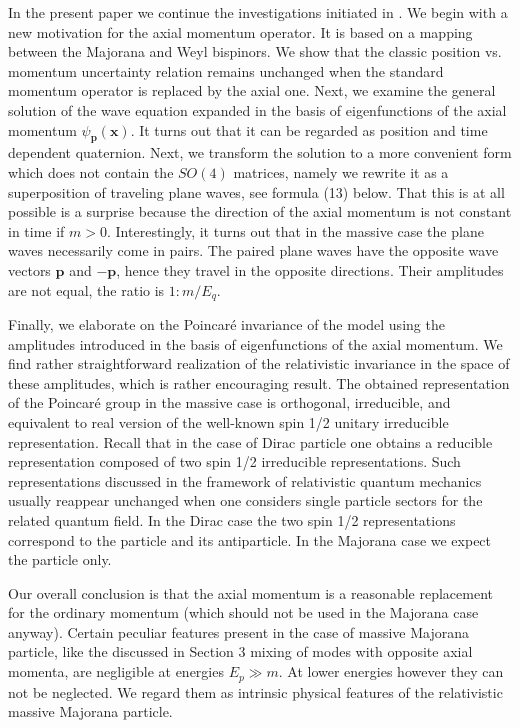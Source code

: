 \documentclass[12pt]{article}
\begin{document}
In the present paper we continue the investigations  initiated in \cite{10}.    We begin with a new motivation for the axial momentum operator. It  is  based on a mapping between  the Majorana and Weyl bispinors.   We show that  the classic position vs. momentum uncertainty relation   remains unchanged when the standard momentum operator is replaced by the axial one.  Next, we examine  the  general solution of the wave equation  expanded in the basis of eigenfunctions of the axial momentum  $\psi_{\mathbf{p}}(\mathbf{x})$.   It turns out that  it can be regarded as  position and time dependent  quaternion.  Next, 
 we transform the solution  to a more convenient form which does not contain the $SO(4)$ matrices, namely we rewrite it as a superposition of traveling plane waves, see formula (13)  below.   That this is at all  possible   is a surprise because the direction of the axial momentum is not constant in time if $m>0$.   Interestingly, it turns out that in the massive case the plane waves necessarily come in pairs. The paired  plane waves have  the opposite  wave vectors $\mathbf{p}$ and   $- \mathbf{p}$, hence they travel in the opposite directions.  Their amplitudes  are not equal,  the ratio is  $1: m/E_q $.  





Finally, we elaborate on the Poincar\'e  invariance of the model  using  the   amplitudes introduced in the basis of  eigenfunctions of the  axial momentum. We find rather straightforward  realization of the relativistic invariance in the space of these amplitudes, which is rather  encouraging result. The obtained  representation of the Poincar\'e group   in the massive case is orthogonal,   irreducible, and equivalent to real version of the well-known  spin 1/2  unitary irreducible  representation. Recall that in the case of Dirac particle one obtains a  reducible representation composed of  two  spin 1/2  irreducible representations.  
 Such representations discussed  in the framework of relativistic quantum mechanics  usually  reappear unchanged when one considers single particle sectors  for the related  quantum field.  In the Dirac case the two spin 1/2 representations correspond to the particle and its antiparticle. In the Majorana case we expect the particle only.  

Our overall conclusion is that   the axial momentum is  a reasonable replacement for the ordinary momentum  (which should not be used in the Majorana case anyway).  Certain peculiar features present in the case of massive Majorana particle, like the discussed in Section 3 mixing of modes with  opposite  axial momenta,   are  negligible at  energies  $E_p \gg m$.  At lower energies  however they can not be neglected. We regard them as  intrinsic physical features of the relativistic massive Majorana particle.
\end{document}
